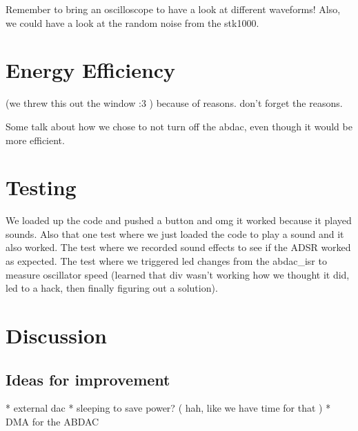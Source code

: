 

Remember to bring an oscilloscope to have a look at different waveforms! Also, we could have a look at the random noise from the stk1000.

\section{Energy Efficiency}

(we threw this out the window :3 )
because of reasons. don't forget the reasons.

Some talk about how we chose to not turn off the abdac, even though it would be more efficient.


\section{Testing}
We loaded up the code and pushed a button and omg it worked because it played sounds.
Also that one test where we just loaded the code to play a sound and it also worked.
The test where we recorded sound effects to see if the ADSR worked as expected.
The test where we triggered led changes from the abdac_isr to measure oscillator speed (learned that div wasn't working how we thought it did, led to a hack, then finally figuring out a solution).


\section{Discussion}

\subsection{Ideas for improvement}

* external dac
* sleeping to save power? ( hah, like we have time for that )
* DMA for the ABDAC

